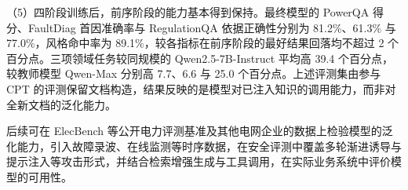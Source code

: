 \documentclass[fontset=fandol,type=master,campus=shenzhen,etitleauto=true]{hithesisbook}
\begin{document}
\begin{conclusions}
（5）四阶段训练后，前序阶段的能力基本得到保持。最终模型的 PowerQA 得分、FaultDiag 首因准确率与 RegulationQA 依据正确性分别为 81.2\%、61.3\% 与 77.0\%，风格命中率为 89.1\%，较各指标在前序阶段的最好结果回落均不超过 2 个百分点。三项领域任务较同规模的 Qwen2.5-7B-Instruct 平均高 39.4 个百分点，较教师模型 Qwen-Max 分别高 7.7、6.6 与 25.0 个百分点。上述评测集由参与 CPT 的评测保留文档构造，结果反映的是模型对已注入知识的调用能力，而非对全新文档的泛化能力。

后续可在 ElecBench\cite{ref21} 等公开电力评测基准及其他电网企业的数据上检验模型的泛化能力，引入故障录波、在线监测等时序数据，在安全评测中覆盖多轮渐进诱导与提示注入等攻击形式，并结合检索增强生成与工具调用，在实际业务系统中评价模型的可用性。

\end{conclusions}
\end{document}
